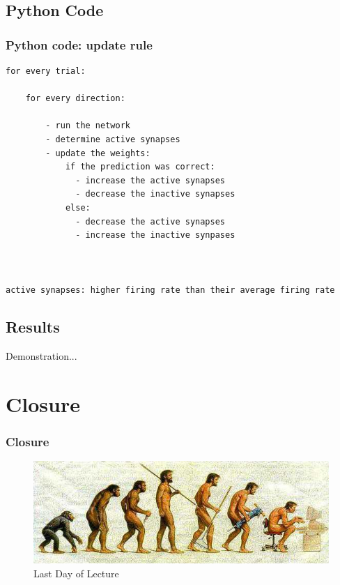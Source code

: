 \documentclass{beamer}
\begin{document}
\subsection{Python Code}
\begin{frame}[fragile]
    \frametitle{Python code: update rule}
 \begin{lstlisting}
for every trial:

    for every direction:

        - run the network
        - determine active synapses
        - update the weights:
            if the prediction was correct:
              - increase the active synapses
              - decrease the inactive synapses
            else:
              - decrease the active synapses
              - increase the inactive synpases



active synapses: higher firing rate than their average firing rate

 \end{lstlisting}

\end{frame} 

\subsection{Results}

\begin{frame}
 
  Demonstration...
\end{frame}


\section{Closure}
\begin{frame}[plain]
 \frametitle{Closure}
 \begin{figure}
  \includegraphics[scale=0.5]{fig/Evolution.jpg} 
  \caption{Last Day of Lecture}
 \end{figure}
\end{frame}
\end{document}
